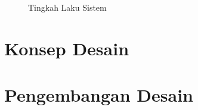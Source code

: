     \begin{figure}[tbh]
        \centering
        
        \caption{Tingkah Laku Sistem}\label{fig:resource_alloc}
    \end{figure}

\section{Konsep Desain}
\section{Pengembangan Desain}
\blindtext
